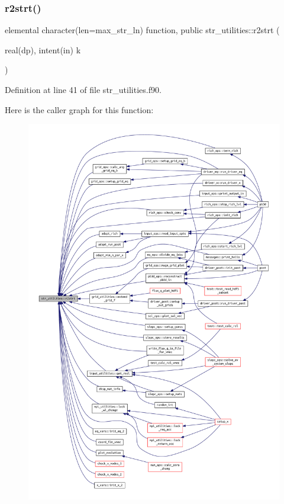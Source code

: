 \subsubsection{\texorpdfstring{r2strt()}{r2strt()}}
{\footnotesize\ttfamily elemental character(len=max\+\_\+str\+\_\+ln) function, public str\+\_\+utilities\+::r2strt (\begin{DoxyParamCaption}\item[{real(dp), intent(in)}]{k }\end{DoxyParamCaption})}



Definition at line 41 of file str\+\_\+utilities.\+f90.

Here is the caller graph for this function\+:
\nopagebreak
\begin{figure}[H]
\begin{center}
\leavevmode
\includegraphics[width=350pt]{namespacestr__utilities_ac778d706b2e021672618939ab58fdd32_icgraph}
\end{center}
\end{figure}
\mbox{\label{namespacestr__utilities_a219964a283968cc6a968db0197d2187e}} 
